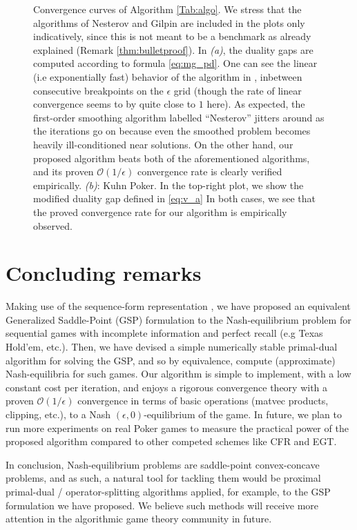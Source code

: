 \documentclass{article}
\begin{document}
\begin{figure}[!htpb]
  \caption{Convergence curves of Algorithm
    \ref{Tab:algo}.  We stress that the algorithms of Nesterov
    \cite{nesterov2005a} and Gilpin \cite{gilpinfirst} are included in
    the plots only indicatively, since this is not meant to be a
    benchmark as already explained (Remark \ref{thm:bulletproof}). In
    \textit{(a)}, the duality gaps
    are computed according to formula \eqref{eq:mg_pd}. One can see
    the linear (i.e exponentially fast) behavior of the algorithm in
    \cite{gilpinfirst}, inbetween consecutive breakpoints on the
    $\epsilon$ grid (though the rate of linear convergence seems
    to by quite close to $1$ here). As expected, the first-order smoothing
    algorithm labelled ``Nesterov'' \cite{nesterov2005a} jitters
    around as the iterations go on because even the smoothed problem
    becomes heavily ill-conditioned
    near solutions. On the other hand, our proposed
    algorithm beats both of the aforementioned algorithms, and
  its proven $\mathcal{O}(1/\epsilon)$ convergence rate is clearly
  verified empirically.
  \textit{(b)}: Kuhn Poker. In the top-right plot, we show the
  modified duality gap defined in \eqref{eq:v_a} In both cases, we see
  that the proved convergence rate for our algorithm is empirically
  observed.}
  \label{Tab:dgap_curve}
\end{figure}

\section{Concluding remarks}
Making use of the sequence-form representation
\cite{koller1992complexity,von1996efficient,vonequilibrium}, we have
proposed an equivalent Generalized Saddle-Point (GSP) formulation to
the Nash-equilibrium problem for sequential games with incomplete
information and perfect recall (e.g Texas Hold'em, etc.). Then, we
have devised a simple numerically stable primal-dual algorithm for
solving the GSP, and so by equivalence, compute (approximate)
Nash-equilibria for such games. Our algorithm is simple to implement,
with a low constant cost per iteration, and enjoys a rigorous
convergence theory with a proven $\mathcal{O}(1/\epsilon)$ convergence
in terms of basic operations (matvec products, clipping, etc.), to a
Nash $(\epsilon,0)$-equilibrium of the game. In future, we plan to run
more experiments on real Poker games to measure the practical power of
the proposed algorithm compared to other competed schemes like CFR and
EGT.

In conclusion, Nash-equilibrium problems are saddle-point
convex-concave problems, and as such, a natural tool
for tackling them would be proximal primal-dual / operator-splitting
algorithms applied, for example, to the GSP formulation we have
proposed. We believe such methods will receive more attention
in the algorithmic game theory community in future.
\end{document}
